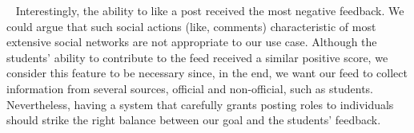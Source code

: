 ~
Interestingly, the ability to like a post received the most negative feedback. We could argue that such social actions (like, comments) characteristic of most extensive social networks are not appropriate to our use case. Although the students' ability to contribute to the feed received a similar positive score, we consider this feature to be necessary since, in the end, we want our feed to collect information from several sources, official and non-official, such as students. Nevertheless, having a system that carefully grants posting roles to individuals should strike the right balance between our goal and the students' feedback.